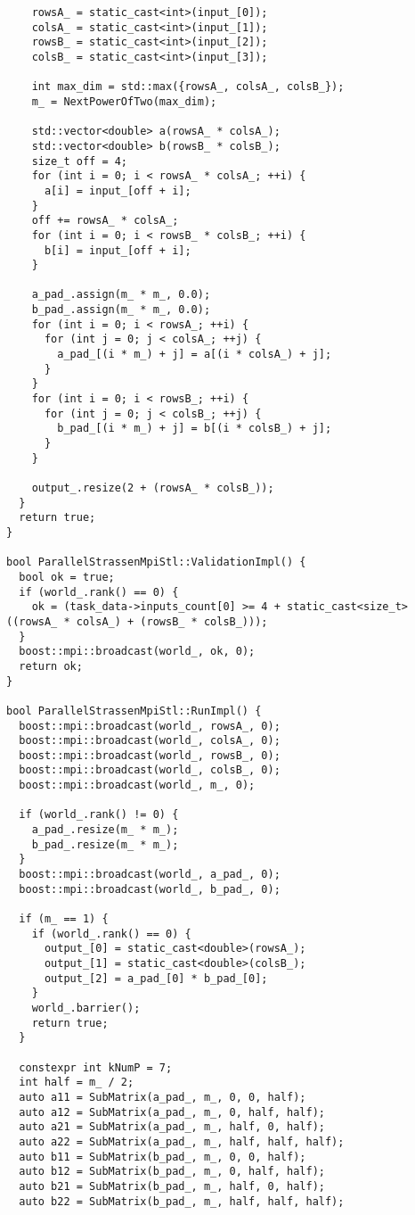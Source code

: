 \documentclass[12pt]{article}
\begin{document}
\begin{lstlisting}
    rowsA_ = static_cast<int>(input_[0]);
    colsA_ = static_cast<int>(input_[1]);
    rowsB_ = static_cast<int>(input_[2]);
    colsB_ = static_cast<int>(input_[3]);

    int max_dim = std::max({rowsA_, colsA_, colsB_});
    m_ = NextPowerOfTwo(max_dim);

    std::vector<double> a(rowsA_ * colsA_);
    std::vector<double> b(rowsB_ * colsB_);
    size_t off = 4;
    for (int i = 0; i < rowsA_ * colsA_; ++i) {
      a[i] = input_[off + i];
    }
    off += rowsA_ * colsA_;
    for (int i = 0; i < rowsB_ * colsB_; ++i) {
      b[i] = input_[off + i];
    }

    a_pad_.assign(m_ * m_, 0.0);
    b_pad_.assign(m_ * m_, 0.0);
    for (int i = 0; i < rowsA_; ++i) {
      for (int j = 0; j < colsA_; ++j) {
        a_pad_[(i * m_) + j] = a[(i * colsA_) + j];
      }
    }
    for (int i = 0; i < rowsB_; ++i) {
      for (int j = 0; j < colsB_; ++j) {
        b_pad_[(i * m_) + j] = b[(i * colsB_) + j];
      }
    }

    output_.resize(2 + (rowsA_ * colsB_));
  }
  return true;
}

bool ParallelStrassenMpiStl::ValidationImpl() {
  bool ok = true;
  if (world_.rank() == 0) {
    ok = (task_data->inputs_count[0] >= 4 + static_cast<size_t>((rowsA_ * colsA_) + (rowsB_ * colsB_)));
  }
  boost::mpi::broadcast(world_, ok, 0);
  return ok;
}

bool ParallelStrassenMpiStl::RunImpl() {
  boost::mpi::broadcast(world_, rowsA_, 0);
  boost::mpi::broadcast(world_, colsA_, 0);
  boost::mpi::broadcast(world_, rowsB_, 0);
  boost::mpi::broadcast(world_, colsB_, 0);
  boost::mpi::broadcast(world_, m_, 0);

  if (world_.rank() != 0) {
    a_pad_.resize(m_ * m_);
    b_pad_.resize(m_ * m_);
  }
  boost::mpi::broadcast(world_, a_pad_, 0);
  boost::mpi::broadcast(world_, b_pad_, 0);

  if (m_ == 1) {
    if (world_.rank() == 0) {
      output_[0] = static_cast<double>(rowsA_);
      output_[1] = static_cast<double>(colsB_);
      output_[2] = a_pad_[0] * b_pad_[0];
    }
    world_.barrier();
    return true;
  }

  constexpr int kNumP = 7;
  int half = m_ / 2;
  auto a11 = SubMatrix(a_pad_, m_, 0, 0, half);
  auto a12 = SubMatrix(a_pad_, m_, 0, half, half);
  auto a21 = SubMatrix(a_pad_, m_, half, 0, half);
  auto a22 = SubMatrix(a_pad_, m_, half, half, half);
  auto b11 = SubMatrix(b_pad_, m_, 0, 0, half);
  auto b12 = SubMatrix(b_pad_, m_, 0, half, half);
  auto b21 = SubMatrix(b_pad_, m_, half, 0, half);
  auto b22 = SubMatrix(b_pad_, m_, half, half, half);


\end{lstlisting}
\end{document}
